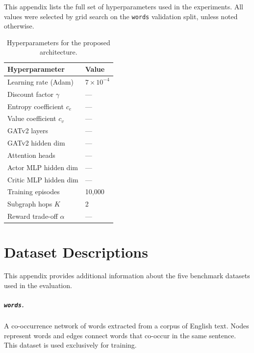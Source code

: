 \documentclass[11pt,a4paper,twoside]{tesis}
\begin{document}
This appendix lists the full set of hyperparameters used in the experiments. All
values were selected by grid search on the \texttt{words} validation split, unless
noted otherwise.

\begin{table}[H]
\centering
\caption{Hyperparameters for the proposed architecture.}
\label{tab:hyperparams}
\begin{tabular}{ll}
\toprule
Hyperparameter & Value \\
\midrule
Learning rate (Adam)       & $7 \times 10^{-4}$ \\
Discount factor $\gamma$   & ---                \\
Entropy coefficient $c_e$  & ---                \\
Value coefficient $c_v$    & ---                \\
GATv2 layers               & ---                \\
GATv2 hidden dim           & ---                \\
Attention heads            & ---                \\
Actor MLP hidden dim       & ---                \\
Critic MLP hidden dim      & ---                \\
Training episodes          & 10,000             \\
Subgraph hops $K$          & 2                  \\
Reward trade-off $\alpha$  & ---                \\
\bottomrule
\end{tabular}
\end{table}



\chapter{Dataset Descriptions}
\label{app:datasets}

This appendix provides additional information about the five benchmark datasets used
in the evaluation.

\paragraph{\texttt{words}.}
A co-occurrence network of words extracted from a corpus of English text. Nodes represent
words and edges connect words that co-occur in the same sentence. This dataset is used
exclusively for training.
\end{document}
